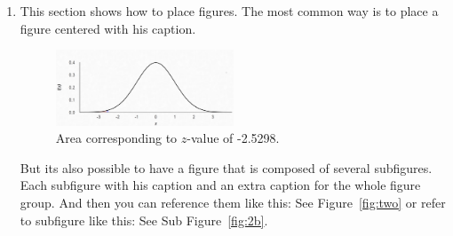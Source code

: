 \begin{enumerate}
 \item This section shows how to place figures.
 The most common way is to place a figure centered with his caption.
 
\begin{figure}[htb]
  \centering
  \label{fig:one}
  \includegraphics[width=0.5\textwidth]{img/normal}
  \caption{Area corresponding to $z$-value of -2.5298.}
\end{figure}

But its also possible to have a figure that is composed of several subfigures.
Each subfigure with his caption and an extra caption for the whole figure group.
And then you can reference them like this: See Figure~\ref{fig:two} or refer to subfigure like this: See Sub Figure~\ref{fig:2b}.


\end{enumerate}

